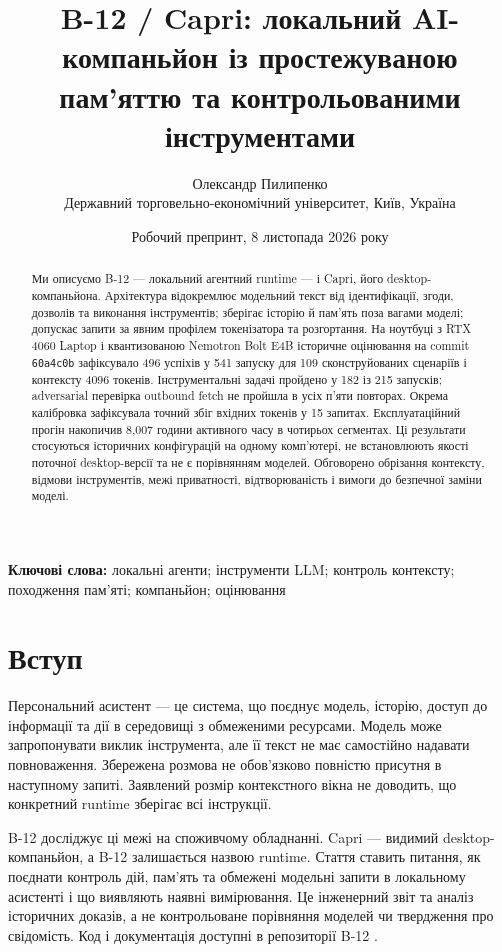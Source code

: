 \documentclass[11pt]{article}
\title{B-12 / Capri: локальний AI-компаньйон із простежуваною пам'яттю та контрольованими інструментами}
\author{Олександр Пилипенко\\Державний торговельно-економічний університет, Київ, Україна}
\date{Робочий препринт, 8 листопада 2026 року}
\begin{document}
\raggedright
\sloppy
\maketitle
\begin{abstract}
Ми описуємо B-12 --- локальний агентний runtime --- і Capri, його desktop-компаньйона. Архітектура відокремлює модельний текст від ідентифікації, згоди, дозволів та виконання інструментів; зберігає історію й пам'ять поза вагами моделі; допускає запити за явним профілем токенізатора та розгортання. На ноутбуці з RTX 4060 Laptop і квантизованою Nemotron Bolt E4B історичне оцінювання на commit \texttt{60a4c0b} зафіксувало 496 успіхів у 541 запуску для 109 сконструйованих сценаріїв і контексту 4096 токенів. Інструментальні задачі пройдено у 182 із 215 запусків; adversarial перевірка outbound fetch не пройшла в усіх п'яти повторах. Окрема калібровка зафіксувала точний збіг вхідних токенів у 15 запитах. Експлуатаційний прогін накопичив 8,007 години активного часу в чотирьох сегментах. Ці результати стосуються історичних конфігурацій на одному комп'ютері, не встановлюють якості поточної desktop-версії та не є порівнянням моделей. Обговорено обрізання контексту, відмови інструментів, межі приватності, відтворюваність і вимоги до безпечної заміни моделі.
\end{abstract}
\noindent\textbf{Ключові слова:} локальні агенти; інструменти LLM; контроль контексту; походження пам'яті; компаньйон; оцінювання

\section{Вступ}
Персональний асистент --- це система, що поєднує модель, історію, доступ до інформації та дії в середовищі з обмеженими ресурсами. Модель може запропонувати виклик інструмента, але її текст не має самостійно надавати повноваження. Збережена розмова не обов'язково повністю присутня в наступному запиті. Заявлений розмір контекстного вікна не доводить, що конкретний runtime зберігає всі інструкції.

B-12 досліджує ці межі на споживчому обладнанні. Capri --- видимий desktop-компаньйон, а B-12 залишається назвою runtime. Стаття ставить питання, як поєднати контроль дій, пам'ять та обмежені модельні запити в локальному асистенті і що виявляють наявні вимірювання. Це інженерний звіт та аналіз історичних доказів, а не контрольоване порівняння моделей чи твердження про свідомість. Код і документація доступні в репозиторії B-12 \cite{b12}.
\end{document}
